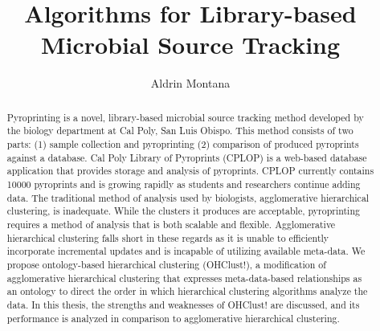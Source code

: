 \documentclass[12pt]{ucthesis}
\begin{document}
\title{Algorithms for Library-based Microbial Source Tracking}
\author{Aldrin Montana}



\maketitle
\begin{frontmatter}
   \copyrightpage

   \committeemembershippage

   \begin{abstract}
      Pyroprinting is a novel, library-based microbial source tracking method
      developed by the biology department at Cal Poly, San Luis Obispo. This
      method consists of two parts: (1) sample collection and pyroprinting (2)
      comparison of produced pyroprints against a database. Cal Poly Library of
      Pyroprints (CPLOP) is a web-based database application that provides
      storage and analysis of pyroprints. CPLOP currently contains 10000
      pyroprints and is growing rapidly as students and researchers continue
      adding data. The traditional method of analysis used by biologists,
      \textsf{agglomerative hierarchical clustering}, is inadequate. While the
      clusters it produces are acceptable, pyroprinting requires a method of
      analysis that is both scalable and flexible. \textsf{Agglomerative
      hierarchical clustering} falls short in these regards as it is unable to
      efficiently incorporate incremental updates and is incapable of utilizing
      available meta-data. We propose \textsf{ontology-based hierarchical
      clustering} (\textsf{OHClust!}), a modification of \textsf{agglomerative
      hierarchical clustering} that expresses meta-data-based relationships as
      an ontology to direct the order in which hierarchical clustering
      algorithms analyze the data. In this thesis, the strengths and weaknesses
      of \textsf{OHClust!} are discussed, and its performance is analyzed in
      comparison to \textsf{agglomerative hierarchical clustering}.
   \end{abstract}


\end{frontmatter}
\end{document}

